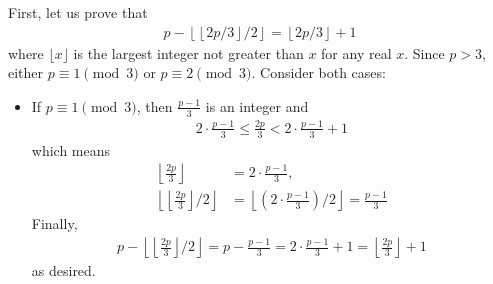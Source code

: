 \documentclass{subfile}
\begin{document}
	\begin{solution}
		First, let us prove that
		\begin{align}\label{eq:primefloor}
		p - \left\lfloor \left\lfloor 2p/3\right\rfloor /2\right\rfloor = \left\lfloor 2p/3\right\rfloor + 1
		\end{align}
		where $\lfloor x \rfloor$ is the largest integer not greater than $x$ for any real $x$. Since $p>3$, either $p \equiv 1 \pmod 3$ or $p \equiv 2 \pmod 3$. Consider both cases:
		\begin{itemize}
			\item If $p \equiv 1 \pmod 3$, then $\frac{p-1}{3}$ is an integer and
			\begin{align*}
			2\cdot\frac {p - 1}{3}\leq\frac {2p}{3} < 2\cdot\frac {p - 1}{3} + 1
			\end{align*}
			which means
			\begin{align*}
			\left\lfloor\frac {2p}{3}\right\rfloor &= 2\cdot\frac {p - 1}{3},\\
			\left\lfloor\left\lfloor\frac {2p}{3}\right\rfloor /2\right\rfloor &= \left\lfloor\left(2\cdot\frac {p - 1}{3}\right)/2\right\rfloor = \frac {p - 1}{3}
			\end{align*}
			Finally,
			\begin{align*}
			p - \left\lfloor\left\lfloor\frac {2p}{3}\right\rfloor /2\right\rfloor = p - \frac {p - 1}{3} = 2\cdot\frac {p - 1}{3} + 1 = \left\lfloor\frac {2p}{3}\right\rfloor + 1
			\end{align*}
			as desired.


\end{itemize}
\end{solution}
\end{document}

